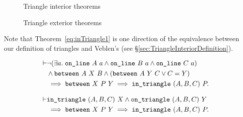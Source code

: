 \begin{figure}
\centering
{}
\qquad{}
\caption{Triangle interior theorems}
\label{fig:inTriangleTheorems}
\end{figure}

\begin{figure}
\centering{}
\qquad{}
\caption{Triangle exterior theorems}
\label{fig:outTriangleTheorems}
\end{figure}

Note that Theorem~\ref{eq:inTriangle1} is one direction of the equivalence between our definition of triangles and Veblen's (see \S\ref{sec:TriangleInteriorDefinition}).

\begin{equation}\label{eq:inTriangle1}
  \begin{split}
    \vdash&\neg(\exists a.\; \texttt{on\_line}\ A\ a\wedge \texttt{on\_line}\ B\ a\wedge \texttt{on\_line}\ C\ a)\\
    &\wedge \texttt{between}\ A\ X\ B \wedge (\texttt{between}\ A\ Y\ C \vee C = Y)\\
    &\implies \texttt{between}\ X\ P\ Y \implies \texttt{in\_triangle}\ (A,B,C)\ P.
  \end{split}
\end{equation}

\begin{equation}\label{eq:inTriangle2}
  \begin{split}
    \vdash&\texttt{in\_triangle}\ (A,B,C)\ X \wedge \texttt{on\_triangle}\ (A,B,C)\ Y\\
    &\implies \texttt{between}\ X\ P\ Y \implies \texttt{in\_triangle}\ (A,B,C)\ P.
  \end{split}
\end{equation}

